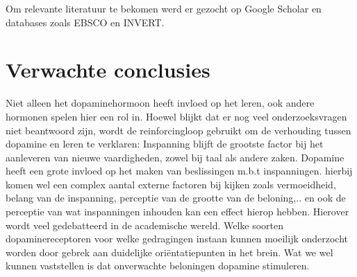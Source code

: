 \documentclass{hogent-article}
\begin{document}

Om relevante literatuur te bekomen werd er gezocht op Google Scholar en databases zoals EBSCO en INVERT.

\section{Verwachte conclusies}


Niet alleen het dopaminehormoon heeft invloed op het leren, ook andere hormonen spelen hier een rol in. Hoewel blijkt dat er nog veel onderzoeksvragen niet beantwoord zijn, wordt de reinforcingloop gebruikt om de verhouding tussen dopamine en leren te verklaren:
Inspanning blijft de grootste factor bij het aanleveren van nieuwe vaardigheden, zowel bij taal als andere zaken. Dopamine heeft een grote invloed op het maken van beslissingen m.b.t inspanningen. hierbij komen wel een complex aantal externe factoren bij kijken zoals vermoeidheid, belang van de inspanning, perceptie van de grootte van de beloning,.. en ook de perceptie van wat inspanningen inhouden kan een effect hierop hebben. Hierover wordt veel gedebatteerd in de academische wereld. Welke soorten dopaminereceptoren voor welke gedragingen instaan kunnen moeilijk onderzocht worden door gebrek aan duidelijke oriëntatiepunten in het brein. Wat we wel kunnen vaststellen is dat onverwachte beloningen dopamine stimuleren.



\printbibliography[heading=bibintoc]
\end{document}
